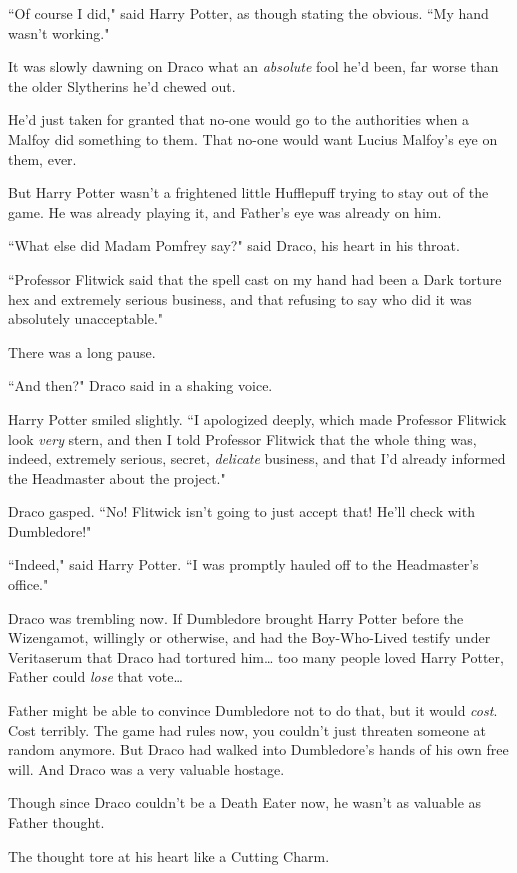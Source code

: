 ``Of course I did," said Harry Potter, as though stating the obvious. ``My hand wasn't working."

It was slowly dawning on Draco what an \emph{absolute} fool he'd been, far worse than the older Slytherins he'd chewed out.

He'd just taken for granted that no-one would go to the authorities when a Malfoy did something to them. That no-one would want Lucius Malfoy's eye on them, ever.

But Harry Potter wasn't a frightened little Hufflepuff trying to stay out of the game. He was already playing it, and Father's eye was already on him.

``What else did Madam Pomfrey say?" said Draco, his heart in his throat.

``Professor Flitwick said that the spell cast on my hand had been a Dark torture hex and extremely serious business, and that refusing to say who did it was absolutely unacceptable."

There was a long pause.

``And then?" Draco said in a shaking voice.

Harry Potter smiled slightly. ``I apologized deeply, which made Professor Flitwick look \emph{very} stern, and then I told Professor Flitwick that the whole thing was, indeed, extremely serious, secret, \emph{delicate} business, and that I'd already informed the Headmaster about the project."

Draco gasped. ``No! Flitwick isn't going to just accept that! He'll check with Dumbledore!"

``Indeed," said Harry Potter. ``I was promptly hauled off to the Headmaster's office."

Draco was trembling now. If Dumbledore brought Harry Potter before the Wizengamot, willingly or otherwise, and had the Boy-Who-Lived testify under Veritaserum that Draco had tortured him{\ldots} too many people loved Harry Potter, Father could \emph{lose} that vote{\ldots}

Father might be able to convince Dumbledore not to do that, but it would \emph{cost}. Cost terribly. The game had rules now, you couldn't just threaten someone at random anymore. But Draco had walked into Dumbledore's hands of his own free will. And Draco was a very valuable hostage.

Though since Draco couldn't be a Death Eater now, he wasn't as valuable as Father thought.

The thought tore at his heart like a Cutting Charm.

